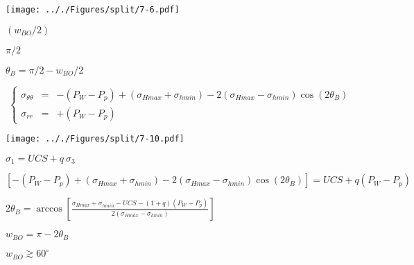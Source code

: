 \documentclass[onecolumn,11pt]{report}
\def\lthtmlcheckvsize{\ifdim\ht\sizebox<\vsize 
  \ifdim\wd\sizebox<\hsize\expandafter\hfill\fi \expandafter\vfill
  \else\expandafter\vss\fi}%
\begin{document}
{\newpage\clearpage
{}%
\texttt{[image: .././Figures/split/7-6.pdf]}%
\lthtmlpictureZ
\lthtmlcheckvsize\clearpage}

{\newpage\clearpage
{}%
$ (w_{BO}/2)$%
\lthtmlindisplaymathZ
\lthtmlcheckvsize\clearpage}

{\newpage\clearpage
{}%
$ \pi/2$%
\lthtmlindisplaymathZ
\lthtmlcheckvsize\clearpage}

{\newpage\clearpage
{}%
$ \theta_B = \pi/2 - w_{BO}/2$%
\lthtmlindisplaymathZ
\lthtmlcheckvsize\clearpage}

{\newpage\clearpage
{}%
\begin{displaymath}\left\lbrace
\begin{array}{rcl}
\sigma_{\theta \theta} & = &
-(P_W - P_p) + (\sigma_{Hmax} + \sigma_{hmin})
- 2(\sigma_{Hmax} - \sigma_{hmin})
\cos (2 \theta_B)  \\
\sigma_{rr} & = &  +(P_W - P_p)
\end{array}
\right.\end{displaymath}%
\lthtmldisplayZ
\lthtmlcheckvsize\clearpage}

{\newpage\clearpage
{}%
\texttt{[image: .././Figures/split/7-10.pdf]}%
\lthtmlpictureZ
\lthtmlcheckvsize\clearpage}

{\newpage\clearpage
{}%
$ \sigma_1 = UCS + q \: \sigma_3$%
\lthtmlindisplaymathZ
\lthtmlcheckvsize\clearpage}

{\newpage\clearpage
{}%
$\displaystyle \left[ -(P_W - P_p) + (\sigma_{Hmax} + \sigma_{hmin})
- 2(\sigma_{Hmax} - \sigma_{hmin}) \cos (2 \theta_B) \right]
= UCS + q (P_W - P_p)$%
\lthtmlindisplaymathZ
\lthtmlcheckvsize\clearpage}

{\newpage\clearpage
{}%
$\displaystyle 2 \theta_B = \arccos \left[ \frac{ \sigma_{Hmax} + \sigma_{hmin} - UCS - (1+q)(P_W - P_p)}{2(\sigma_{Hmax} - \sigma_{hmin})} \right]$%
\lthtmlindisplaymathZ
\lthtmlcheckvsize\clearpage}

{\newpage\clearpage
{}%
$\displaystyle w_{BO} = \pi - 2 \theta_B$%
\lthtmlindisplaymathZ
\lthtmlcheckvsize\clearpage}

{\newpage\clearpage
{}%
$ w_{BO} \gtrsim 60^{\circ}$%
\lthtmlindisplaymathZ
\lthtmlcheckvsize\clearpage}
\end{document}
